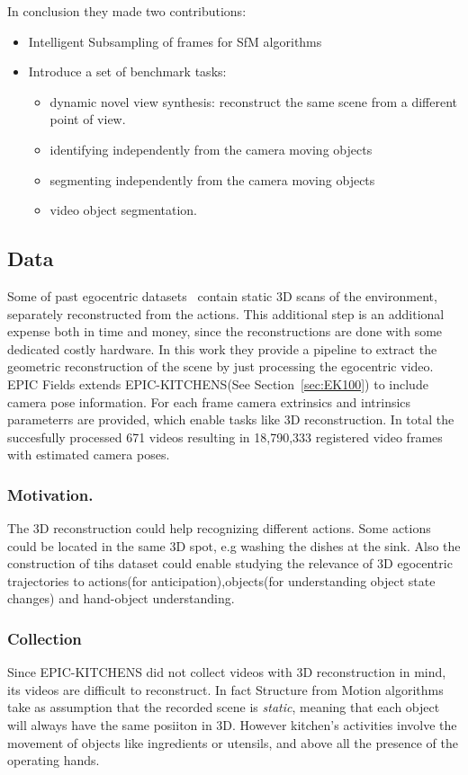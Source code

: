 In conclusion they made two contributions:
\begin{itemize}
    \item Intelligent Subsampling of frames for SfM algorithms 
    \item Introduce a set of benchmark tasks: \begin{itemize}
        \item dynamic novel view synthesis: reconstruct the same scene from a different point of view.
        \item identifying independently from the camera moving objects
        \item segmenting independently from the camera moving objects
        \item video object segmentation.
    \end{itemize}
\end{itemize}

\subsection{Data}
Some of past egocentric datasets~\cite{visor35,visor5} contain static 3D scans of the environment, separately reconstructed from 
the actions. This additional step is an additional expense both in time and money, since the reconstructions are done with some dedicated costly hardware.
In this work they provide a pipeline to extract the geometric reconstruction of the scene by just processing the egocentric video.
EPIC Fields extends EPIC-KITCHENS(See Section~\ref{sec:EK100}) to include camera pose information. For each frame camera extrinsics and intrinsics parameterrs are provided, 
which enable tasks like 3D reconstruction. In total the succesfully processed 671 videos resulting in 18,790,333 registered video frames with estimated camera poses.

\subsubsection{Motivation.} 
The 3D reconstruction could help recognizing different actions. Some actions could be located in the same 3D spot, e.g washing the dishes at the sink.
Also the construction of tihs dataset could enable studying the relevance of 3D egocentric trajectories to actions(for anticipation),objects(for understanding object state changes)
and hand-object understanding.

\subsubsection{Collection}
Since EPIC-KITCHENS did not collect videos with 3D reconstruction in mind, its videos are difficult to reconstruct. In fact Structure from Motion algorithms take as assumption
that the recorded scene is \textit{static}, meaning that each object will always have the same posiiton in 3D. However kitchen's activities involve the movement of objects like 
ingredients or utensils, and above all the presence of the operating hands.

